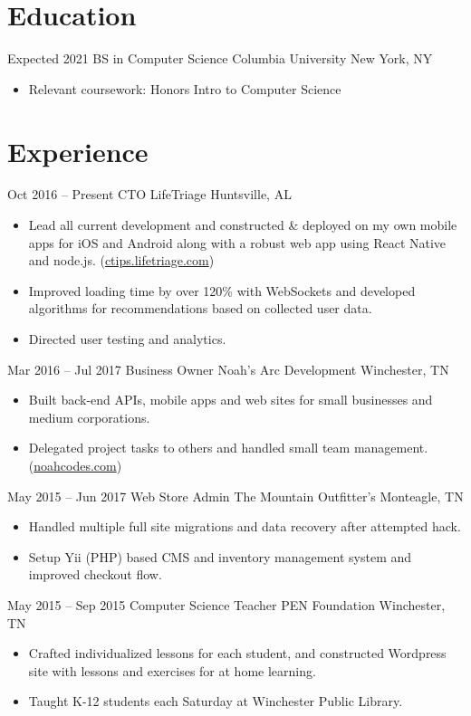 \documentclass[letterpaper]{moderncv}        %
\begin{document}
\makecvtitle
\section{Education}
\cventry
{Expected 2021}
{BS in Computer Science}
{Columbia University}
{New York, NY}
{}
{\begin{itemize}%
	\item Relevant coursework: Honors Intro to Computer Science
	\end{itemize}}
\section{Experience}
\cventry
{Oct 2016 -- Present}
{CTO}
{LifeTriage}
{Huntsville, AL}
{}
{\begin{itemize}%
	\item Lead all current development and constructed \& deployed on my own mobile apps for iOS and Android along with a robust web app using React Native and node.js. (\href{https://ctips.lifetriage.com}{ctips.lifetriage.com})
	\item Improved loading time by over 120\% with WebSockets and developed algorithms for recommendations based on collected user data.
	\item Directed user testing and analytics.
	\end{itemize}}
\cventry
{Mar 2016 -- Jul 2017}
{Business Owner}
{Noah's Arc Development}
{Winchester, TN}
{}
{\begin{itemize}%
	\item  Built back-end APIs, mobile apps and web sites for small businesses and medium corporations.
	\item  Delegated project tasks to others and handled small team management. (\href{https://noahcodes.com/}{noahcodes.com})
	\end{itemize}}
\cventry
{May 2015 -- Jun 2017}
{Web Store Admin}
{The Mountain Outfitter's}
{Monteagle, TN}
{}
{\begin{itemize}%
	\item  Handled multiple full site migrations and data recovery after attempted hack.
	\item  Setup Yii (PHP) based CMS and inventory management system and improved checkout flow.
	\end{itemize}}
\cventry
{May 2015 -- Sep 2015}
{Computer Science Teacher}
{PEN Foundation}
{Winchester, TN}
{}
{\begin{itemize}%
	\item  Crafted individualized lessons for each student, and constructed Wordpress site with lessons and exercises for at home learning.
	\item Taught K-12 students each Saturday at Winchester Public Library.
	\end{itemize}}
\end{document}
